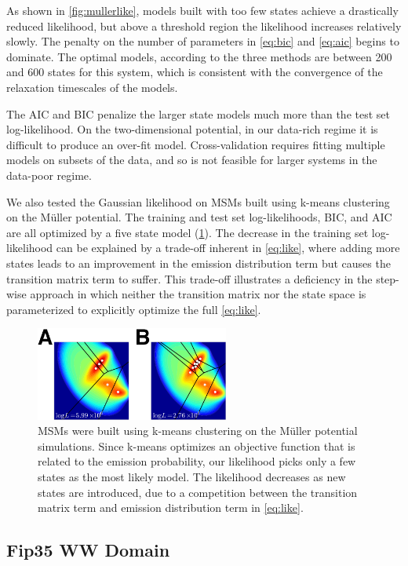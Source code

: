 \documentclass[journal=jpcbfk, layout=twocolumn, manuscript=article]{achemso}
\begin{document}
As shown in \cref{fig:mullerlike}, models built with too few states achieve a drastically reduced likelihood, but above a threshold region the likelihood increases relatively slowly. The penalty on the number of parameters in \cref{eq:bic} and \cref{eq:aic} begins to dominate. The optimal models, according to the three methods are between 200 and 600 states for this system, which is consistent with the convergence of the relaxation timescales of the models. 

The AIC and BIC penalize the larger state models much more than the test set log-likelihood. On the two-dimensional potential, in our data-rich regime it is difficult to produce an over-fit model. Cross-validation requires fitting multiple models on subsets of the data, and so is not feasible for larger systems in the data-poor regime.

We also tested the Gaussian likelihood on MSMs built using k-means clustering on the M\"uller potential. The training and test set log-likelihoods, BIC, and AIC are all optimized by a five state model (\cref{fig:kmeans_mull}). The decrease in the training set log-likelihood can be explained by a trade-off inherent in \cref{eq:like}, where adding more states leads to an improvement in the emission distribution term but causes the transition matrix term to suffer. This trade-off illustrates a deficiency in the step-wise approach in which neither the transition matrix nor the state space is parameterized to explicitly optimize the full \cref{eq:like}.

\begin{figure}
\centering
\includegraphics[width=2.5in]{figs_final/kmeans_like2_lbl.png}
\caption{MSMs were built using k-means clustering on the M\"uller potential simulations. Since k-means optimizes an objective function that is related to the emission probability, our likelihood picks only a few states as the most likely model. The likelihood decreases as new states are introduced, due to a competition between the transition matrix term and emission distribution term in \cref{eq:like}.}
\label{fig:kmeans_mull}
\end{figure}

\subsection{Fip35 WW Domain}
\end{document}
